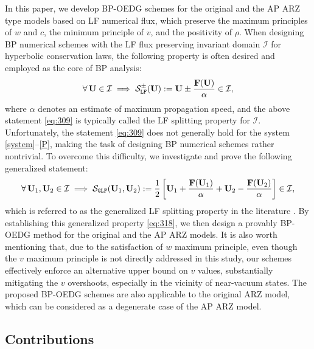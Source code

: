 \documentclass[times,final]{elsarticle}
\numberwithin{equation}{section}
\theoremstyle{definition}
\theoremstyle{remark}
\newcommand{\BU}{\mathbf{U}}
\newcommand{\BF}{\mathbf{F}}
\begin{document}
In this paper, we develop BP-OEDG schemes for the original and the AP ARZ type models based on LF numerical flux, which preserve the maximum principles of $w$ and $c$, the minimum principle of $v$, and the positivity of $\rho$.
When designing BP numerical schemes with the LF flux preserving invariant domain $\mathcal{I}$ for hyperbolic conservation laws, the following property \cite{zhang2010b,WuTang2015} is often desired and employed as the core of BP analysis:
\begin{equation}\label{eq:309}
	\forall \, \BU \in \mathcal{I}
	\; \Longrightarrow \;
	\mathcal{S}^\pm_{\tt LF}(\BU) := \BU \pm \frac{\BF({\BU})}{\alpha} \in \mathcal{I},
\end{equation}
where $\alpha$ denotes an estimate of maximum propagation speed, and the above statement \eqref{eq:309} is typically called the LF splitting property \cite{WuTang2015} for $\mathcal{I}$.
Unfortunately, the statement \eqref{eq:309} does not generally hold for the system \eqref{system}--\eqref{P}, making the task of designing BP numerical schemes rather nontrivial.
To overcome this difficulty, we investigate and prove the following generalized statement:
\begin{equation}\label{eq:318}
	\forall \, \BU_1, \BU_2 \in \mathcal{I}
	\; \Longrightarrow \; 
	\mathcal{S}_{\tt GLF}(\BU_1,\BU_2) := 
	\frac12
	\left[
	\BU_1 + \frac{\BF({\BU_1})}{\alpha}
	+
	\BU_2 - \frac{\BF({\BU_2})}{\alpha}
	\right]
	\in \mathcal{I},
\end{equation}
which is referred to as the generalized  LF splitting property in the literature \cite{wu2018positivity}. 
By establishing this generalized property \eqref{eq:318}, we then design a provably BP-OEDG method for the original and the AP ARZ models. 
It is also worth mentioning that, due to the satisfaction of $w$ maximum principle, even though the $v$ maximum principle is not directly addressed in this study, our schemes effectively enforce an alternative upper bound on $v$ values, substantially mitigating the $v$ overshoots, especially in the vicinity of near-vacuum states.
The proposed BP-OEDG schemes are also applicable to the original ARZ model, which can be considered as a degenerate case of the AP ARZ model.

\subsection{Contributions}
\end{document}
